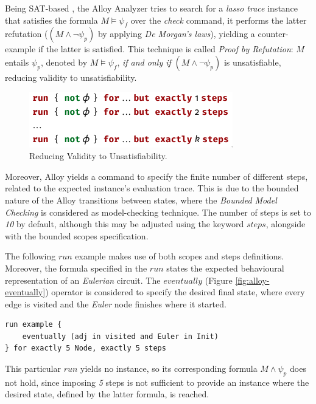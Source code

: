 Being SAT-based \cite{lwspecification}, the Alloy Analyzer tries to search for a \textit{lasso trace} instance that satisfies the formula $M \models \psi_{f}$ over the \textit{check} command, it performs the latter refutation ($(M \wedge \neg \psi_{p})$ by applying \textit{De Morgan's laws}), yielding a counter-example if the latter is satisfied. This technique is called \textit{Proof by Refutation}: $M$ entails $\psi_{p}$, denoted by $M \models \psi_{f}$, \textit{if and only if} $(M \wedge \neg \psi_{p})$ is unsatisfiable, reducing validity to unsatisfiability.

\begin{figure}[H]
    \centering
    \includegraphics[width=0.5\linewidth]{images/check_alloy_2.png}
    \caption{Reducing Validity to Unsatisfiability.}
    \label{fig:alloy-check-2}
\end{figure}

Moreover, Alloy yields a command to specify the finite number of different steps, related to the expected instance's evaluation trace. This is due to the bounded nature of the Alloy transitions between states, where the \textit{Bounded Model Checking} is considered as model-checking technique. The number of steps is set to \textit{10} by default, although this may be adjusted using the keyword $steps$, alongside with the bounded scopes specification. 

The following $run$ example makes use of both scopes and steps definitions. Moreover, the formula specified in the $run$ states the expected behavioural representation of an \textit{Eulerian} circuit. The $eventually$ (Figure \ref{fig:alloy-eventually}) operator is considered to specify the desired final state, where every edge is visited and the \textit{Euler} node finishes where it started.

\begin{lstlisting}[title={Bounded Model Checking: Eventually the graph will represent an \textit{Eulerian} circuit.}, otherkeywords = {run, eventually, in, and, for, exactly, \5, steps}, floatplacement=H]
run example {
    eventually (adj in visited and Euler in Init)
} for exactly 5 Node, exactly 5 steps
\end{lstlisting}

This particular $run$ yields no instance, so its corresponding formula $M \wedge \psi_{p}$ does not hold, since imposing \textit{5} steps is not sufficient to provide an instance where the desired state, defined by the latter formula, is reached.


